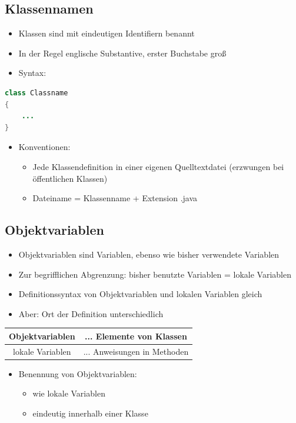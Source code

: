 \subsection{Klassennamen}
\begin{itemize}
\item Klassen sind mit eindeutigen Identifiern benannt
\item In der Regel englische Substantive, erster Buchstabe groß
\item Syntax:
 \end{itemize}
 \begin{lstlisting}[language=JAVA]
class Classname
{
	...
}
 \end{lstlisting}

\begin{itemize}
\item Konventionen:
	\begin{itemize}
	\item Jede Klassendefinition in einer eigenen Quelltextdatei (erzwungen bei öffentlichen Klassen)
	\item Dateiname = Klassenname + Extension .java
	\end{itemize}
\end{itemize}

\subsection{Objektvariablen}
\begin{itemize}
\item Objektvariablen sind Variablen, ebenso wie bisher verwendete Variablen
\item Zur begrifflichen Abgrenzung: bisher benutzte Variablen = lokale Variablen
\item Definitionssyntax von Objektvariablen und lokalen Variablen gleich
\item Aber: Ort der Definition unterschiedlich
\end{itemize}
\begin{tabular}{|c|c|}\hline
Objektvariablen & ... Elemente von Klassen \\ \hline
lokale Variablen & ... Anweisungen in Methoden \\ \hline
\end{tabular}
\begin{itemize}
\item Benennung von Objektvariablen:
	\begin{itemize}
	\item wie lokale Variablen
	\item eindeutig innerhalb einer Klasse
	\end{itemize}
\end{itemize}
